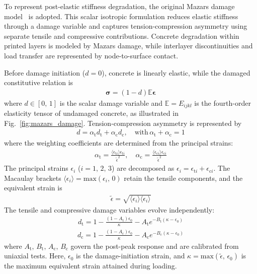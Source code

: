 \documentclass[review, authoryear, 12pt]{elsarticle}
\begin{document}
To represent post-elastic stiffness degradation, the original Mazars damage model~\citep{mazars_continuum_1989} is adopted. This scalar isotropic formulation reduces elastic stiffness through a damage variable and captures tension-compression asymmetry using separate tensile and compressive contributions. Concrete degradation within printed layers is modeled by Mazars damage, while interlayer discontinuities and load transfer are represented by node-to-surface contact.

Before damage initiation ($d = 0$), concrete is linearly elastic, while the damaged constitutive relation is
\begin{align}
    \bm{\sigma} = (1 - d) \mathbb{E} \bm{\epsilon} %
\end{align}
where $d \in [0, \, 1]$ is the scalar damage variable and $\mathbb{E} = E_{ijkl}$ is the fourth-order elasticity tensor of undamaged concrete, as illustrated in Fig.~\ref{fig:mazars_damage}. Tension-compression asymmetry is represented by
\begin{align}
    d = \alpha_{\text{t}} d_{\text{t}} + \alpha_{\text{c}} d_{\text{c}}, \quad \text{with} \, \alpha_{\text{t}} + \alpha_{\text{c}} = 1 %
\end{align}
where the weighting coefficients are determined from the principal strains:
\begin{align}
    \alpha_{\text{t}} = \frac{\langle \epsilon_{\text{t}i} \rangle \epsilon_{\text{t}i}}{\tilde{\epsilon}^{2}}, \quad \alpha_{\text{c}} = \frac{\langle \epsilon_{\text{c}i} \rangle \epsilon_{\text{c}i}}{\tilde{\epsilon}^{2}} %
\end{align}
The principal strains $\epsilon_i$ ($i = 1, \, 2, \, 3$) are decomposed as $\epsilon_i = \epsilon_{\text{t}i} + \epsilon_{\text{c}i}$. The Macaulay brackets $\langle \epsilon_{i} \rangle = \text{max} (\epsilon_i, \, 0)$ retain the tensile components, and the equivalent strain is
\begin{align}
    \tilde{\epsilon} = \sqrt{\langle \epsilon_{i} \rangle \langle \epsilon_{i} \rangle} %
\end{align}
The tensile and compressive damage variables evolve independently:
\begin{align}
    d_{\text{t}} = 1 - \frac{(1 - A_{\text{t}})\epsilon_{0}}{\kappa} - A_{\text{t}} e^{-B_{\text{t}}(\kappa - \epsilon_{0})} %
\end{align}
\begin{align}
    d_{\text{c}} = 1 - \frac{(1 - A_{\text{c}})\epsilon_{0}}{\kappa} - A_{\text{c}} e^{-B_{\text{c}}(\kappa - \epsilon_{0})} %
\end{align}
where $A_{\text{t}}, \, B_{\text{t}}, \, A_{\text{c}}, \, B_{\text{c}}$ govern the post-peak response and are calibrated from uniaxial tests. Here, $\epsilon_0$ is the damage-initiation strain, and $\kappa = \text{max} (\tilde{\epsilon}, \, \epsilon_0)$ is the maximum equivalent strain attained during loading.
\end{document}
